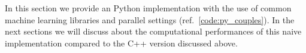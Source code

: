 \documentclass{standalone}
\begin{document}
In this section we provide an  \textsf{Python} implementation with the use of common machine learning libraries and parallel settings (ref.~\ref{code:py_couples}).
In the next sections we will discuss about the computational performances of this naive implementation compared to the \textsf{C++} version discussed above.
\end{document}
